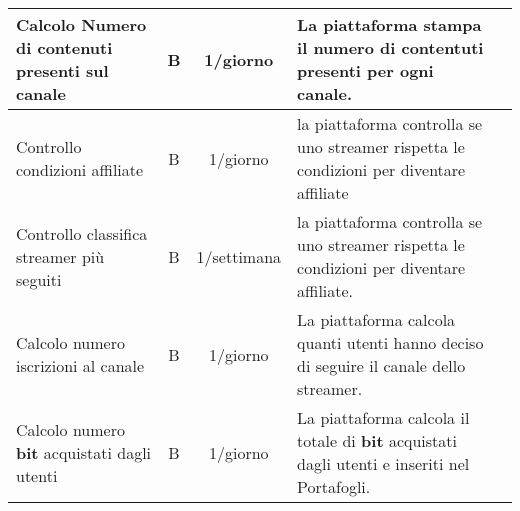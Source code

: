 \begin{longtable}{|l|c|c|p{2.5cm}|c}
  Calcolo Numero di contenuti presenti sul canale &B& 1/giorno &La piattaforma stampa il numero di contentuti presenti per ogni canale. \\\hline
  Controllo condizioni affiliate & B &1/giorno & la piattaforma controlla se uno streamer rispetta le condizioni per diventare affiliate  \\\hline
  Controllo classifica streamer più seguiti & B & 1/settimana  & la piattaforma controlla se uno streamer rispetta le condizioni per diventare affiliate. \\\hline
  Calcolo numero iscrizioni al canale &B&1/giorno&La piattaforma calcola quanti utenti hanno deciso di seguire il canale dello streamer.\\\hline
  Calcolo numero \textbf{bit} acquistati dagli utenti &B& 1/giorno &La piattaforma calcola il totale di \textbf{bit} acquistati dagli utenti e inseriti nel Portafogli.\\\hline
\end{longtable}
\normalsize
